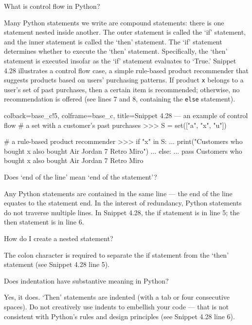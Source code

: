 \documentclass[a4paper,11pt]{book}
\newcommand{\question}[1]{%
    \begin{tcolorbox}[colback=comp_c!10,colframe=comp_c,sidebyside align=top,width=\linewidth,before skip=1ex]
        #1
    \end{tcolorbox}
    \switchcolumn%
}
\newcommand{\note}[1]{%
    \begin{tcolorbox}[colback=white!0,colframe=white!10,width=\linewidth,before skip=1ex]
        #1
    \end{tcolorbox}
}
\begin{document}
\begin{paracol}{2}
\question{\raggedright What is control flow in Python?}
\note{Many Python statements we write are compound statements: there is one statement nested inside another. The outer statement is called the `if' statement, and the inner statement is called the `then' statement. The `if' statement determines whether to execute the `then' statement. Specifically, the `then' statement is executed insofar as the `if' statement evaluates to `True.' Snippet 4.28 illustrates a control flow case, a simple rule-based product recommender that suggests products based on users' purchasing patterns. If product \texttt{x} belongs to a user's set of past purchases, then a certain item is recommended; otherwise, no recommendation is offered (see lines 7 and 8, containing the \texttt{else} statement).} 
\end{paracol}

\begin{pythoncode}[linenos=true,]{colback=base_c!5, colframe=base_c, title=\sffamily Snippet 4.28 --- an example of control flow}
# a set with a customer's past purchases
>>> S = set(["a", "x", "u"])

# a rule-based product recommender 
>>> if "x" in S:
...     print("Customers who bought x also bought Air Jordan 7 Retro Miro")
... else:
...     pass
Customers who bought x also bought Air Jordan 7 Retro Miro
\end{pythoncode}

\begin{paracol}{2}
	\question{\raggedright Does `end of the line' mean `end of the statement'?}
	\note{Any Python statements are contained in the same line --- the end of the line equates to the statement end. In the interest of redundancy, Python statements do not traverse multiple lines. In Snippet 4.28, the if statement is in line 5; the then statement is in line 6.} 
\end{paracol}

\begin{paracol}{2}
	\question{\raggedright How do I create a nested statement?}
	\note{The colon character is required to separate the if statement from the `then' statement (see Snippet 4.28 line 5).}
\end{paracol}	

\begin{paracol}{2}
	\question{\raggedright Does indentation have substantive meaning in Python?}
	\note{Yes, it does. `Then' statements are indented (with a tab or four consecutive spaces). Do not creatively use indents to embellish your code --- that is not consistent with Python's rules and design principles (see Snippet 4.28 line 6).}
\end{paracol}
\end{document}
